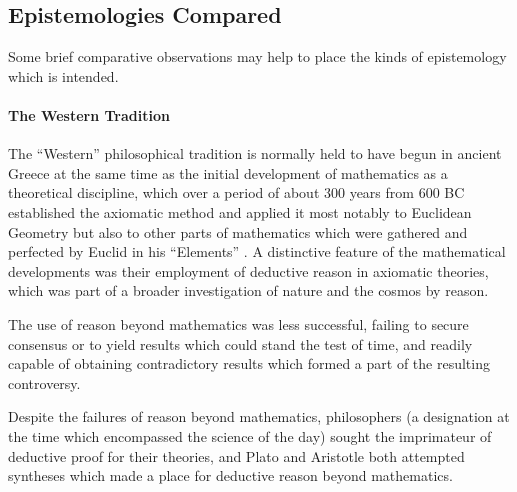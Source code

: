 \documentclass[10pt,titlepage]{book}
\newcommand{\ignore}[1]{}
\begin{document}
\ignore{
The following concepts are useful in characterising the kinds of knowledge and its pre-cursors which become a significant part of the evolutionary history beyond its particular manifestations in homo sapiens.

\begin{itemize}
\item information
\item representation, model
\item declarative knowledge
\item episteme
\item epistemology
\end{itemize}

}%

\subsection{Epistemologies Compared}

Some brief comparative observations may help to place the kinds of epistemology which is intended.

\paragraph{The Western Tradition}

The ``Western'' philosophical tradition is normally held to have begun in ancient Greece at the same time as the initial development of mathematics as a theoretical discipline, which over a period of about 300 years from 600 BC established the axiomatic method and applied it most notably to Euclidean Geometry but also to other parts of mathematics which were gathered and perfected by Euclid in his ``Elements'' \cite{euclidL1}.
A distinctive feature of the mathematical developments was their employment of deductive reason in axiomatic theories, which was part of a broader investigation of nature and the cosmos by reason.

The use of reason beyond mathematics was less successful, failing to secure consensus or to yield results which could stand the test of time, and readily capable of obtaining contradictory results which formed a part of the resulting controversy.

Despite the failures of reason beyond mathematics, philosophers (a designation at the time which encompassed the science of the day) sought the imprimateur of deductive proof for their theories, and Plato and Aristotle both attempted syntheses which made a place for deductive reason beyond mathematics.
\end{document}

